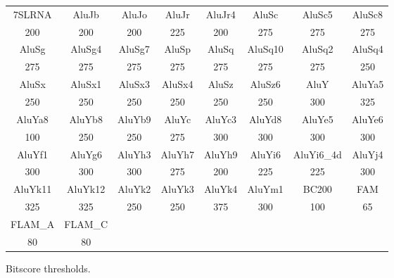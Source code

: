 \begin{figure} %
\centering
\begin{small}
\begin{tabular}{c c c c c c c c}\hline
7SLRNA&AluJb&AluJo&AluJr&AluJr4&AluSc&AluSc5&AluSc8\\
200   &200  &200  &225  &200   &275  &275   &275\\\hline
AluSg&AluSg4&AluSg7&AluSp&AluSq&AluSq10&AluSq2&AluSq4\\
275  &275   &275   &275  &275  &275    &275   &250\\\hline
AluSx&AluSx1&AluSx3&AluSx4&AluSz&AluSz6&AluY&AluYa5\\
250  &250   &250   &250   &250  &250   &300 &325\\\hline
AluYa8&AluYb8&AluYb9&AluYc&AluYc3&AluYd8&AluYe5&AluYe6\\
100   &250   &250   &275  &300   &300   &300   &300\\\hline
AluYf1&AluYg6&AluYh3&AluYh7&AluYh9&AluYi6&AluYi6\_4d&AluYj4\\
300   &300   &300   &275   &200   &225   &225       &300\\\hline
AluYk11&AluYk12&AluYk2&AluYk3&AluYk4&AluYm1&BC200&FAM\\
325    &325    &250   &250   &375   &300   &100  &65\\\hline
FLAM\_A&FLAM\_C\\
80     &80\\
\hline
\end{tabular}
\end{small}
\caption[Bitscore Thresholds]
{Bitscore thresholds.}
\label{fig:dualbirth-bit-thresh}
\end{figure}

